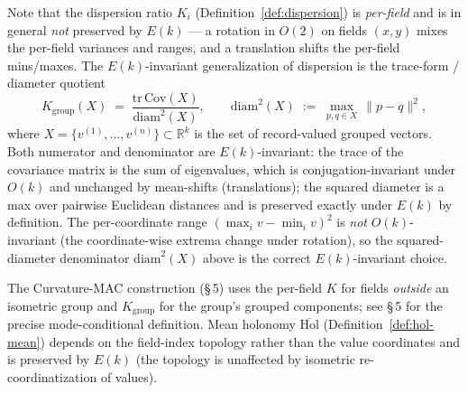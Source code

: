 \documentclass[11pt,letterpaper]{article}
\begin{document}
Note that the dispersion ratio $K_i$
(Definition~\ref{def:dispersion}) is \emph{per-field} and is in
general \emph{not} preserved by $E(k)$ --- a rotation in $O(2)$ on
fields $(x, y)$ mixes the per-field variances and ranges, and a
translation shifts the per-field mins/maxes. The
$E(k)$-invariant generalization of dispersion is the
trace-form / diameter quotient
\[
K_{\mathrm{group}}(X) \;=\; \frac{\mathrm{tr}\,\mathrm{Cov}(X)}
                              {\mathrm{diam}^2(X)},
\qquad
\mathrm{diam}^2(X) \;:=\; \max_{p,q \in X}\, \|p - q\|^2,
\]
where $X = \{v^{(1)}, \ldots, v^{(n)}\} \subset \mathbb{R}^k$ is
the set of record-valued grouped vectors. Both numerator and
denominator are $E(k)$-invariant: the trace of the covariance
matrix is the sum of eigenvalues, which is conjugation-invariant
under $O(k)$ and unchanged by mean-shifts (translations); the
squared diameter is a max over pairwise Euclidean distances and is
preserved exactly under $E(k)$ by definition. The per-coordinate
range $(\max_i v - \min_i v)^2$ is \emph{not} $O(k)$-invariant
(the coordinate-wise extrema change under rotation), so the
squared-diameter denominator $\mathrm{diam}^2(X)$ above is the
correct $E(k)$-invariant choice.

The Curvature-MAC construction
(\S\,5) uses the per-field $K$ for fields
\emph{outside} an isometric group and $K_{\mathrm{group}}$ for
the group's grouped components; see \S\,5
for the precise mode-conditional definition. Mean holonomy
$\overline{\mathrm{Hol}}$ (Definition~\ref{def:hol-mean}) depends
on the field-index topology rather than the value coordinates and
is preserved by $E(k)$ (the topology is unaffected by isometric
re-coordinatization of values).

\end{document}
